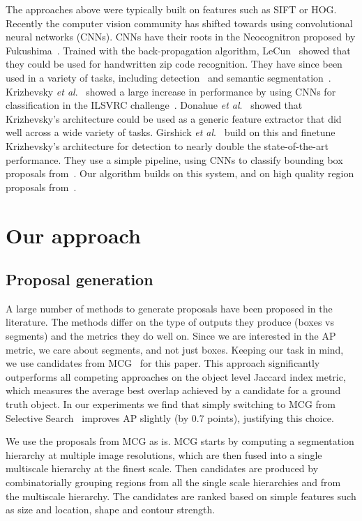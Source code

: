 \documentclass[runningheads]{llncs}
\newcommand\etal{\emph{et al}.\ }
\begin{document}
The approaches above were typically built on features such as SIFT\cite{LoweIJCV04} or HOG\cite{DalalCVPR05}. Recently the computer vision community has shifted towards using convolutional neural networks (CNNs). CNNs have their roots in the Neocognitron proposed by Fukushima~\cite{Fukushima80}. Trained with the back-propagation algorithm, LeCun~\cite{LecunNC89} showed that they could be used for handwritten zip code recognition. They have since been used in a variety of tasks, including detection~\cite{SermanetCVPR13,SermanetICLR14} and semantic segmentation~\cite{FarabetPAMI13}. Krizhevsky \etal\cite{KrizhevskyNIPS12} showed a large increase in performance by using CNNs for classification in the ILSVRC challenge~\cite{ILSVRC12}. Donahue \etal\cite{Donahue13} showed that Krizhevsky's architecture could be used as a generic feature extractor that did well across a wide variety of tasks. Girshick \etal\cite{GirshickCVPR14} build on this and finetune Krizhevsky's architecture for detection to nearly double the state-of-the-art performance. They use a simple pipeline, using CNNs to classify bounding box proposals from~\cite{VanICCV11}. Our algorithm builds on this system, and on high quality region proposals from~\cite{ArbelaezCVPR14}.


\section{Our approach}
\label{sec:approach}
\subsection{Proposal generation}
\label{sec:prop}
A large number of methods to generate proposals have been proposed in the literature. The methods differ on the type of outputs they produce (boxes vs segments) and the metrics they do well on. Since we are interested in the AP metric, we care about segments, and not just boxes. Keeping our task in mind, we use candidates from MCG~\cite{ArbelaezCVPR14} for this paper. This approach significantly outperforms all competing approaches on the object level Jaccard index metric, which measures the average best overlap achieved by a candidate for a ground truth object. In our experiments we find that simply switching to MCG from Selective Search~\cite{VanICCV11} improves AP slightly (by 0.7 points), justifying this choice.

We use the proposals from MCG as is. MCG starts by computing a segmentation hierarchy at multiple image resolutions, which are then fused into a single multiscale hierarchy at the finest scale. Then candidates are produced by combinatorially grouping regions from all the single scale hierarchies and from the multiscale hierarchy. The candidates are ranked based on simple features such as size and location, shape and contour strength.
\end{document}

